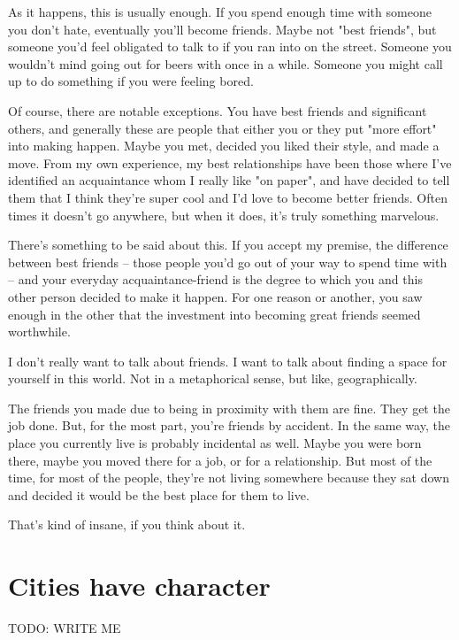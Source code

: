 \documentclass[]{book}
\newcommand{\TOWRITE}{TODO: WRITE ME}
\begin{document}
As it happens, this is usually enough. If you spend enough time with someone you
don't hate, eventually you'll become friends. Maybe not "best friends", but
someone you'd feel obligated to talk to if you ran into on the street. Someone
you wouldn't mind going out for beers with once in a while. Someone you might
call up to do something if you were feeling bored.

Of course, there are notable exceptions. You have best friends and significant
others, and generally these are people that either you or they put "more effort"
into making happen. Maybe you met, decided you liked their style, and made a
move. From my own experience, my best relationships have been those where I've
identified an acquaintance whom I really like "on paper", and have decided to
tell them that I think they're super cool and I'd love to become better friends.
Often times it doesn't go anywhere, but when it does, it's truly something
marvelous.


There's something to be said about this. If you accept my premise, the
difference between best friends -- those people you'd go out of your way to
spend time with -- and your everyday acquaintance-friend is the degree to which
you and this other person decided to make it happen. For one reason or another,
you saw enough in the other that the investment into becoming great friends
seemed worthwhile.


I don't really want to talk about friends. I want to talk about finding a space
for yourself in this world. Not in a metaphorical sense, but like,
geographically.

The friends you made due to being in proximity with them are fine. They get the
job done. But, for the most part, you're friends by accident. In the same way,
the place you currently live is probably incidental as well. Maybe you were born
there, maybe you moved there for a job, or for a relationship. But most of the
time, for most of the people, they're not living somewhere because they sat down
and decided it would be the best place for them to live.

That's kind of insane, if you think about it.

\section{Cities have character}
\TOWRITE
\end{document}
